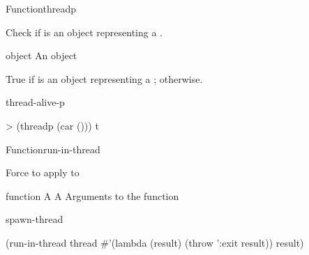 \documentclass[10pt,twoside,english,pdftex]{article}
\begin{document}

\begin{functiondoc}{Function}{threadp}{ \returns{}
    }
%

\fnsyntax

\fnpurpose Check if  is an object representing a
.

\fnpackage {}

\fnmodule {}

\fnargs
\begin{args}{object}
\arg[object] An object
\end{args}

\fnreturns True if  is an object representing a 
; \nil{} otherwise.

\begin{alsos}{thread-alive-p}
\end{alsos}

%
\fnexample
\begin{example}
> (threadp (car ()))
t
\end{example}

\end{functiondoc}


\begin{functiondoc}{Function}{run-in-thread}{
     }
%

\fnsyntax

\fnpurpose Force  to apply  to 

\fnpackage {}

\fnmodule {}

\fnargs
\begin{args}{function}
\arg[thread] A 
\arg[function] A 
\arg[args] Arguments to the function
\end{args}

\fnerrors
\nothreads{}

\begin{alsos}{spawn-thread}
\end{alsos}

\fnexample
\begin{example}
  (run-in-thread thread
                 #'(lambda (result) (throw ':exit result)) 
                 result)
\end{example}

\end{functiondoc}
\end{document}
